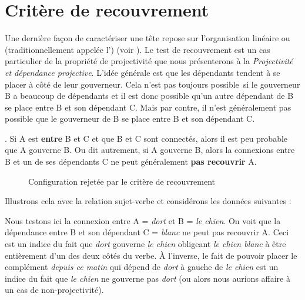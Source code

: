 \section{Critère de recouvrement}\label{sec:3.3.32}

Une dernière façon de caractériser une tête repose sur l’organisation linéaire ou  (traditionnellement appelée l’) (voir ). Le test de recouvrement est un cas particulier de la propriété de projectivité que nous présenterons à la  \textit{Projectivité et dépendance projective}. L’idée générale est que les dépendants tendent à se placer à côté de leur gouverneur. Cela n’est pas toujours possible~si le gouverneur B a beaucoup de dépendants et il est donc possible qu’un autre dépendant de B se place entre B et son dépendant C. Mais par contre, il n’est généralement pas possible que le gouverneur de B se place entre B et son dépendant C.

{. Si A est \textbf{entre} B et C et que B et C sont connectés, alors il est peu probable que A gouverne B. Ou dit autrement, si A gouverne B, alors la connexions entre B et un de ses dépendants C ne peut généralement \textbf{pas recouvrir} A.}

\begin{figure}
\caption{\label{fig:}Configuration rejetée par le critère de recouvrement}
\end{figure}

Illustrons cela avec la relation sujet-verbe et considérons les données suivantes :

\ea
  \z
\z

Nous testons ici la connexion entre A = \textit{dort} et B = \textit{le chien}. On voit que la dépendance entre B et son dépendant C = \textit{blanc} ne peut pas recouvrir A. Ceci est un indice du fait que \textit{dort} gouverne \textit{le chien} obligeant \textit{le chien blanc} à être entièrement d’un des deux côtés du verbe. À l’inverse, le fait de pouvoir placer le complément \textit{depuis ce matin} qui dépend de \textit{dort} à gauche de \textit{le chien} est un indice du fait que \textit{le chien} ne gouverne pas \textit{dort} (ou alors nous aurions affaire à un cas de non-projectivité).

